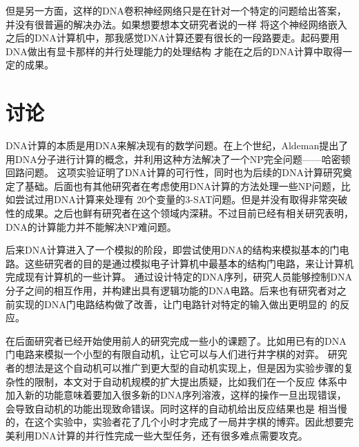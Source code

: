 \documentclass[a4paper,twoside]{article}
\begin{document}
但是另一方面，这样的DNA卷积神经网络只是在针对一个特定的问题给出答案，并没有很普遍的解决办法。如果想要想本文研究者说的一样
将这个神经网络嵌入之后的DNA计算机中，那我感觉DNA计算还要有很长的一段路要走。起码要用DNA做出有显卡那样的并行处理能力的处理结构
才能在之后的DNA计算中取得一定的成果。

\newpage
\section{讨论}
DNA计算的本质是用DNA来解决现有的数学问题。在上个世纪，Aldeman提出了用DNA分子进行计算的概念，并利用这种方法解决了一个NP完全问题——哈密顿回路问题。
这项实验证明了DNA计算的可行性，同时也为后续的DNA计算研究奠定了基础。后面也有其他研究者在考虑使用DNA计算的方法处理一些NP问题，比如尝试过用DNA计算来处理有
20个变量的3-SAT问题。但是并没有取得非常突破性的成果。之后也鲜有研究者在这个领域内深耕。不过目前已经有相关研究表明，DNA的计算能力并不能解决NP难问题。

后来DNA计算进入了一个模拟的阶段，即尝试使用DNA的结构来模拟基本的门电路。这些研究者的目的是通过模拟电子计算机中最基本的结构门电路，来让计算机完成现有计算机的一些计算。
通过设计特定的DNA序列，研究人员能够控制DNA分子之间的相互作用，并构建出具有逻辑功能的DNA电路。后来也有研究者对之前实现的DNA门电路结构做了改善，让门电路针对特定的输入做出更明显的
的反应。

在后面研究者已经开始使用前人的研究完成一些小的课题了。比如用已有的DNA门电路来模拟一个小型的有限自动机，让它可以与人们进行井字棋的对弈。
研究者的想法是这个自动机可以推广到更大型的自动机实现上，但是因为实验步骤的复杂性的限制，本文对于自动机规模的扩大提出质疑，比如我们在一个反应
体系中加入新的功能意味着要加入很多新的DNA序列溶液，这样的操作一旦出现错误，会导致自动机的功能出现致命错误。同时这样的自动机给出反应结果也是
相当慢的，在这个实验中，实验者花了几个小时才完成了一局井字棋的博弈。因此想要完美利用DNA计算的并行性完成一些大型任务，还有很多难点需要攻克。
\end{document}
